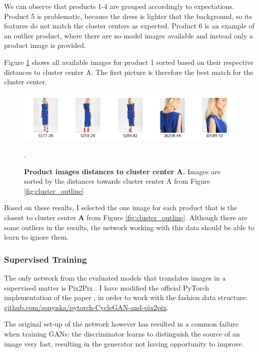 \documentclass{article}
\begin{document}
We can observe that products 1-4 are grouped accordingly to expectations. Product 5 is problematic, because the dress is lighter that the background, so its features do not match the cluster centers as expected. Product 6 is an example of an outlier product, where there are no model images available and instead only a product image is provided.

Figure \ref{fig:cluster_outline_distances} shows all available images for product 1 sorted based on their respective distances to cluster center A. The first picture is therefore the best match for the cluster center.

\begin{figure}[h]
\centering
{\includegraphics[width=\linewidth]{clustering/outlines_distances}}
\caption{\label{fig:cluster_outline_distances} \textbf{Product images distances to cluster center A.} Images are sorted by the distances towards cluster center A from Figure \ref{fig:cluster_outline}}.
\end{figure}

Based on these results, I selected the one image for each product that is the closest to cluster center \textbf{A} from Figure \ref{fig:cluster_outline}. Although there are some outliers in the results, the network working with this data should be able to learn to ignore them.

\pagebreak
\subsubsection{Supervised Training}
The only network from the evaluated models that translates images in a supervised matter is Pix2Pix \cite{isola_image--image_2016}. I have modified the official PyTorch implementation of the paper \cite{noauthor_junyanz/pytorch-cyclegan-and-pix2pix_nodate}, in order to work with the fashion data structure: \hyperlink{https://github.com/sonynka/pytorch-CycleGAN-and-pix2pix}{github.com/sonynka/pytorch-CycleGAN-and-pix2pix}.

The original set-up of the network however has resulted in a common failure when training GANs: the discriminator learns to distinguish the source of an image very fast, resulting in the generator not having opportunity to improve.
\end{document}
